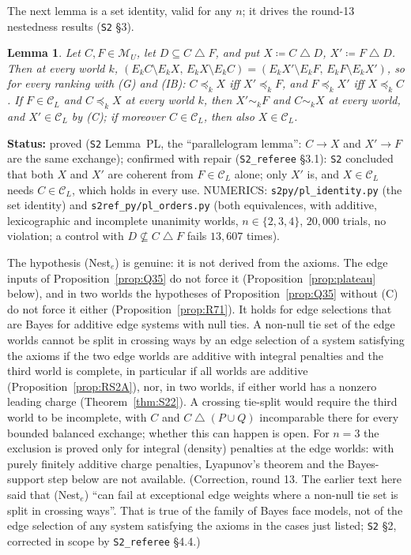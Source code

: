 \documentclass[11pt]{article}
\newtheorem{lemma}[theorem]{Lemma}
\theoremstyle{definition}
\theoremstyle{remark}
\newcommand{\M}{\mathcal M}
\newcommand{\C}{\mathcal C}
\newcommand{\sd}{\mathbin{\triangle}}
\newcommand{\src}[1]{\texttt{#1}}
\newcommand{\status}[1]{\par\smallskip\noindent\textbf{Status:} #1\par\smallskip}
\begin{document}
The next lemma is a set identity, valid for any $n$; it drives the round-13 nestedness results (\src{S2} \S3).

\begin{lemma}\label{lem:PL}
Let $C,F\in\M_U$, let $D\subseteq C\sd F$, and put $X\coloneqq C\sd D$, $X'\coloneqq F\sd D$. Then at every world $k$, $(E_kC\setminus E_kX,\,E_kX\setminus E_kC)=(E_kX'\setminus E_kF,\,E_kF\setminus E_kX')$, so for every ranking with (G) and (IB): $C\preceq_kX$ iff $X'\preceq_kF$, and $F\preceq_kX'$ iff $X\preceq_kC$. If $F\in\C_L$ and $C\preceq_kX$ at every world $k$, then $X'\sim_kF$ and $C\sim_kX$ at every world, and $X'\in\C_L$ by (C); if moreover $C\in\C_L$, then also $X\in\C_L$.
\end{lemma}
\status{proved (\src{S2} Lemma~PL, the ``parallelogram lemma'': $C\to X$ and $X'\to F$ are the same exchange); confirmed with repair (\src{S2\_referee} \S3.1): \src{S2} concluded that both $X$ and $X'$ are coherent from $F\in\C_L$ alone; only $X'$ is, and $X\in\C_L$ needs $C\in\C_L$, which holds in every use. NUMERICS: \src{s2py/pl\_identity.py} (the set identity) and \src{s2ref\_py/pl\_orders.py} (both equivalences, with additive, lexicographic and incomplete unanimity worlds, $n\in\{2,3,4\}$, $20{,}000$ trials, no violation; a control with $D\not\subseteq C\sd F$ fails $13{,}607$ times).}

The hypothesis (Nest$_e$) is genuine: it is not derived from the axioms. The edge inputs of Proposition~\ref{prop:Q35} do not force it (Proposition~\ref{prop:plateau} below), and in two worlds the hypotheses of Proposition~\ref{prop:Q35} without (C) do not force it either (Proposition~\ref{prop:R71}). It holds for edge selections that are Bayes for additive edge systems with null ties. A non-null tie set of the edge worlds cannot be split in crossing ways by an edge selection of a system satisfying the axioms if the two edge worlds are additive with integral penalties and the third world is complete, in particular if all worlds are additive (Proposition~\ref{prop:RS2A}), nor, in two worlds, if either world has a nonzero leading charge (Theorem~\ref{thm:S22}). A crossing tie-split would require the third world to be incomplete, with $C$ and $C\sd(P\cup Q)$ incomparable there for every bounded balanced exchange; whether this can happen is open. For $n=3$ the exclusion is proved only for integral (density) penalties at the edge worlds: with purely finitely additive charge penalties, Lyapunov's theorem and the Bayes-support step below are not available. (Correction, round 13. The earlier text here said that (Nest$_e$) ``can fail at exceptional edge weights where a non-null tie set is split in crossing ways''. That is true of the family of Bayes face models, not of the edge selection of any system satisfying the axioms in the cases just listed; \src{S2} \S2, corrected in scope by \src{S2\_referee} \S4.4.)
\end{document}
